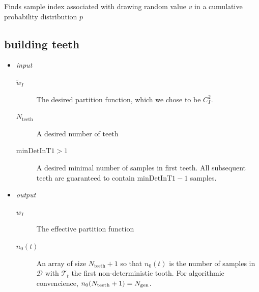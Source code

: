 \documentclass[./thesis.tex]{subfiles}
\newcommand{\minDetInT}{\text{minDetInT1}}
\newcommand{\Nteeth}{N_\text{teeth}}
\begin{document}
\begin{algorithm}
\label{alg:FIND_SAMPLE}
\caption[FIND\_SAMPLE]{Finds sample index associated with drawing random value $v$ in a cumulative probability distribution $p$}

	
	
\end{algorithm}




\subsection{building teeth}

\begin{itemize}

\item
\emph{input}
\begin{description}
\item[$\tilde w_I$]
The desired partition function, which we chose to be $C_I^2$.
\item[$\Nteeth$]
A desired number of teeth
\item[$\minDetInT > 1$]
A desired minimal number of samples in first teeth. All subsequent teeth are guaranteed to contain $\minDetInT-1$ samples.
\end{description}

\item
\emph{output}
\begin{description}
\item[$w_I$]
The effective partition function
\item[$n_0(t)$]
An array of size $\Nteeth+1$ so that $n_0(t)$ is the number of samples in $\mathcal{D}$ with $\mathcal{T}_t$ the first non-deterministic tooth. For algorithmic convencience, $n_0(\Nteeth+1)=\Ngen$.
\end{description}
\end{itemize}
\end{document}
